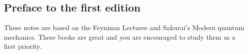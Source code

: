 \documentclass[10pt]{memoir}
\begin{document}
\begin{multicols}{3}
\chapter{Preface to the first edition}
These notes are based on the Feynman Lectures and Sakurai's Modern quantum mechanics.  
These books are great and  you are encouraged to study them as a first
priority.  




\end{multicols}
\end{document}

